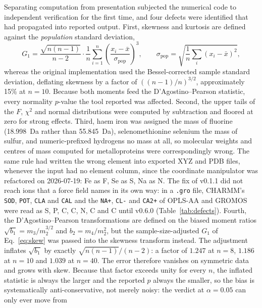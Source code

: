 \documentclass[11pt,a4paper]{article}
\begin{document}
Separating computation from presentation subjected the numerical code to
independent verification for the first time, and four defects were identified
that had propagated into reported output. First, skewness and kurtosis are
defined against the \emph{population} standard deviation,
\begin{equation}
  G_1 = \frac{\sqrt{n(n-1)}}{n-2}
        \cdot \frac{1}{n}\sum_{i=1}^{n}
        \left(\frac{x_i - \bar{x}}{\sigma_{\mathrm{pop}}}\right)^{\!3},
    \qquad
  \sigma_{\mathrm{pop}} = \sqrt{\frac{1}{n}\sum_i (x_i - \bar{x})^2},
  \label{eq:skew}
\end{equation}
whereas the original implementation used the Bessel-corrected sample standard
deviation, deflating skewness by a factor of $\left((n-1)/n\right)^{3/2}$,
approximately 15\% at $n = 10$. Because both moments feed the
D'Agostino--Pearson statistic, every normality $p$-value the tool reported was
affected. Second, the upper tails of the $F$, $\chi^2$ and normal distributions were computed by subtraction and floored at zero for strong effects. Third, haem iron was assigned the mass of
fluorine (18.998~Da rather than 55.845~Da), selenomethionine selenium the mass
of sulfur, and numeric-prefixed hydrogens no mass at all, so molecular weights
and centres of mass computed for metalloproteins were correspondingly wrong. The same rule had written the wrong element into exported XYZ and PDB files, whenever the input had no element column, since the coordinate manipulator was refactored on 2026-07-19: Fe as F, Se as S, Na as N. The fix of v0.1.1 did not reach ions that a force field names in its own way: in a \texttt{.gro} file, CHARMM's \texttt{SOD}, \texttt{POT}, \texttt{CLA} and \texttt{CAL} and the \texttt{NA+}, \texttt{CL-} and \texttt{CA2+} of OPLS-AA and GROMOS were read as S, P, C, C, N, C and C until v0.6.0 (Table~\ref{tab:defects}).
Fourth, the D'Agostino--Pearson transformations are defined on the biased moment
ratios $\sqrt{b_1} = m_3/m_2^{3/2}$ and $b_2 = m_4/m_2^2$, but the
sample-size-adjusted $G_1$ of Eq.~\ref{eq:skew} was passed into the skewness
transform instead. The adjustment inflates $\sqrt{b_1}$ by exactly $\sqrt{n(n-1)}/(n-2)$: a factor
of $1.247$ at $n = 8$, $1.186$ at $n = 10$ and $1.039$ at $n = 40$. The error
therefore vanishes on symmetric data and grows with skew. Because that factor
exceeds unity for every $n$, the inflated statistic is always the larger and the
reported $p$ always the smaller, so the bias is systematically anti-conservative,
not merely noisy: the verdict at $\alpha = 0.05$ can only ever move from
\end{document}
